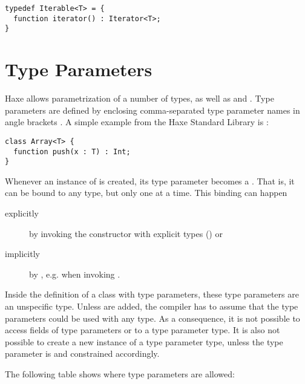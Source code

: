 \begin{lstlisting}
typedef Iterable<T> = {
  function iterator() : Iterator<T>;
}
\end{lstlisting}


\section{Type Parameters}
\label{type-system-type-parameters}

Haxe allows parametrization of a number of types, as well as  and . Type parameters are defined by enclosing comma-separated type parameter names in angle brackets \expr{$<>$}. A simple example from the Haxe Standard Library is :

\begin{lstlisting}
class Array<T> {
  function push(x : T) : Int;
}
\end{lstlisting}
Whenever an instance of  is created, its type parameter  becomes a . That is, it can be bound to any type, but only one at a time. This binding can happen

\begin{description}
	\item[explicitly] by invoking the constructor with explicit types () or
	\item[implicitly] by , e.g. when invoking .
\end{description}
Inside the definition of a class with type parameters, these type parameters are an unspecific type. Unless  are added, the compiler has to assume that the type parameters could be used with any type. As a consequence, it is not possible to access fields of type parameters or  to a type parameter type. It is also not possible to create a new instance of a type parameter type, unless the type parameter is  and constrained accordingly. 

The following table shows where type parameters are allowed:

